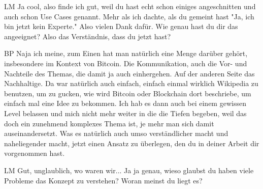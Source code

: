 \begin{xlist}
    \item[LM] Ja cool, also finde ich gut, weil du hast echt schon einiges angeschnitten und auch schon Use Cases genannt. Mehr als ich dachte, als du gemeint hast "Ja, ich bin jetzt kein Experte." Also vielen Dank dafür. Wie genau hast du dir das angeeignet? Also das Verständnis, dass du jetzt hast? 
    \item[BP] Naja ich meine, zum Einen hat man natürlich eine Menge darüber gehört, insbesondere im Kontext von Bitcoin. Die Kommunikation, auch die Vor- und Nachteile des Themas, die damit ja auch einhergehen. Auf der anderen Seite das Nachhaltige. Da war natürlich auch einfach, einfach einmal wirklich Wikipedia zu benutzen, um zu gucken, wie wird Bitcoin oder Blockchain dort beschriebe, um einfach mal eine Idee zu bekommen. Ich hab es dann auch bei einem gewissen Level belassen und mich nicht mehr weiter in die die Tiefen begeben, weil das doch ein zunehmend komplexes Thema ist, je mehr man sich damit auseinandersetzt. Was es natürlich auch umso verständlicher macht und naheliegender macht, jetzt einen Ansatz zu überlegen, den du in deiner Arbeit dir vorgenommen hast.
    \item[LM] Gut, unglaublich, wo waren wir... Ja ja genau, wieso glaubst du haben viele Probleme das Konzept zu verstehen? Woran meinst du liegt es?

\end{xlist}
